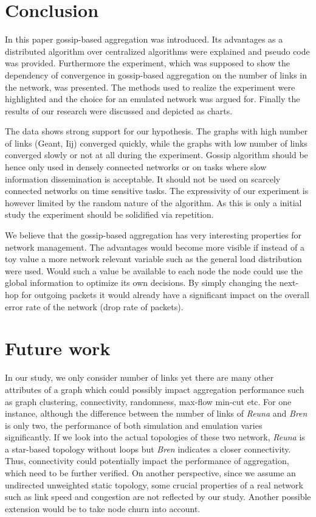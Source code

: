 \section{Conclusion}
\label{sec:conclusion}

In this paper gossip-based aggregation was introduced. Its advantages as a distributed algorithm over centralized algorithms were explained and pseudo code was provided. Furthermore the experiment, which was supposed to show the dependency of convergence in gossip-based aggregation on the number of links in the network, was presented. The methods used to realize the experiment were highlighted and the choice for an emulated network was argued for. Finally the results of our research were discussed and depicted as charts.

The data shows strong support for our hypothesis. The graphs with high number of links (Geant, Iij) converged quickly, while the graphs with low number of links converged slowly or not at all during the experiment. Gossip algorithm should be hence only used in densely connected networks or on tasks where slow information dissemination is acceptable. It should not be used on scarcely connected networks on time sensitive tasks. The expressivity of our experiment is however limited by the random nature of the algorithm. As this is only a initial study the experiment should be solidified via repetition.

We believe that the gossip-based aggregation has very interesting properties for network management. The advantages would become more visible if instead of a toy value a more network relevant variable such as the general load distribution were used. Would such a value be available to each node the node could use the global information to optimize its own decisions. By simply changing the next-hop for outgoing packets it would already have a significant impact on the overall error rate of the network (drop rate of packets).

\section{Future work}
\label{sec:future}
In our study, we only consider number of links yet there are many other attributes of a graph which could possibly impact aggregation performance such as graph clustering\cite{Schaeffer200727}, connectivity, randomness, max-flow min-cut etc. For one instance, although the difference between the number of links of {\it Reuna} and {\it Bren} is only two, the performance of both simulation and emulation varies significantly. If we look into the actual topologies of these two network, {\it Reuna} is a star-based topology without loops but {\it Bren} indicates a closer connectivity. Thus, connectivity could potentially impact the performance of aggregation, which need to be further verified.
On another perspective, since we assume an undirected unweighted static topology, some crucial properties of a real network such as link speed and congestion are not reflected by our study. Another possible extension would be to take node churn into account.

